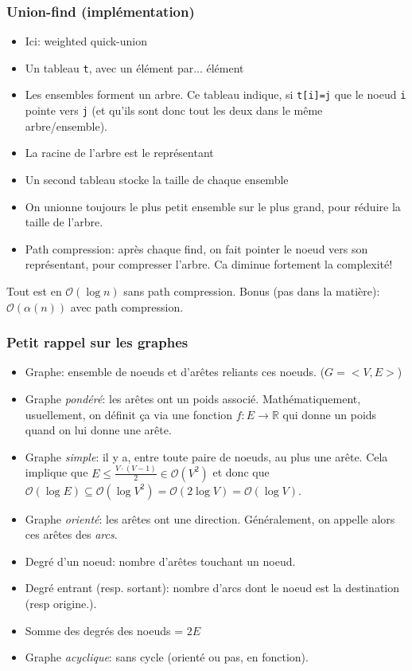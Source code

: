 \documentclass[8pt,aspectratio=169]{beamer}
\begin{document}
\begin{frame}
\frametitle{Union-find (implémentation)}
\begin{itemize}
	\item Ici: weighted quick-union
	\item Un tableau \texttt{t}, avec un élément par... élément
	\item Les ensembles forment un arbre. Ce tableau indique, si \texttt{t[i]=j} que le noeud \texttt{i} pointe vers \texttt{j} (et qu'ils sont donc tout les deux dans le même arbre/ensemble).
	\item La racine de l'arbre est le représentant
	\item Un second tableau stocke la taille de chaque ensemble
	\item On unionne toujours le plus petit ensemble sur le plus grand, pour réduire la taille de l'arbre.
	\item Path compression: après chaque find, on fait pointer le noeud vers son représentant, pour compresser l'arbre. Ca diminue fortement la complexité!
\end{itemize}
Tout est en $\mathcal{O}(\log n)$ sans path compression. Bonus (pas dans la matière): $\mathcal{O}(\alpha(n))$ avec path compression. 
\end{frame}

\begin{frame}
\frametitle{Petit rappel sur les graphes}
\begin{itemize}
	\item Graphe: ensemble de noeuds et d'arêtes reliants ces noeuds. ($G=<V,E>$)
	\item Graphe \textit{pondéré}: les arêtes ont un poids associé. Mathématiquement, usuellement, on définit ça via une fonction $f: E \rightarrow \mathbb{R}$ qui donne un poids quand on lui donne une arête.
	\item Graphe \textit{simple}: il y a, entre toute paire de noeuds, au plus une arête. Cela implique que $E \leq \frac{V\cdot(V-1)}{2} \in \mathcal{O}(V^2)$ et donc que $\mathcal{O}(\log E) \subseteq \mathcal{O}(\log V^2) = \mathcal{O}(2 \log V) = \mathcal{O}(\log V)$.
	\item Graphe \textit{orienté}: les arêtes ont une direction. Généralement, on appelle alors ces arêtes des \textit{arcs}.
	\item Degré d'un noeud: nombre d'arêtes touchant un noeud.
	\item Degré entrant (resp. sortant): nombre d'arcs dont le noeud est la destination (resp origine.).
	\item Somme des degrés des noeuds = $2E$
	\item Graphe \textit{acyclique}: sans cycle (orienté ou pas, en fonction).
\end{itemize}
\end{frame}
\end{document}
